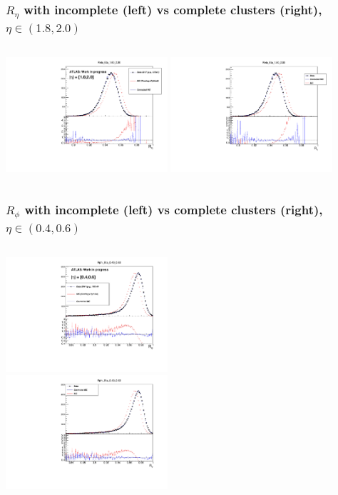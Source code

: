 \documentclass{beamer}
\begin{document}
\begin{frame}
\frametitle{$R_\eta$ with incomplete (left) vs complete clusters (right), $\eta \in (1.8, 2.0)$ }

\begin{columns}[t]
\centering
\includegraphics[width=6cm]{Reta_Eta_18_20.pdf}
\centering
\includegraphics[width=6cm]{Reta_Eta_18_20_Athena.pdf}
\end{columns}
\end{frame}
\begin{frame}
\frametitle{$R_\phi$ with incomplete  (left) vs complete clusters (right), $\eta \in (0.4, 0.6)$ }

\begin{columns}[t]
\centering
\includegraphics[width=6cm]{Rphi_Eta_4_6.pdf}\\
\centering
\includegraphics[width=6cm]{Rphi_Eta_4_6_Athena.pdf}\\
\end{columns}
\end{frame}
\end{document}
